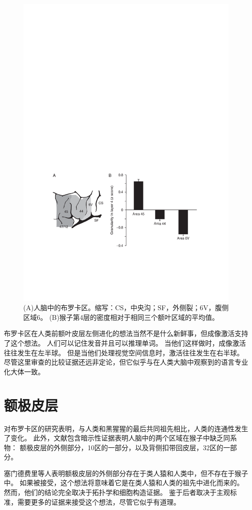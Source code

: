 \begin{figure}[!htb]
	\centering
	\includegraphics[width=0.5\linewidth]{chap9/9_3}
	\caption{(A)人脑中的布罗卡区。缩写：CS，中央沟；SF，外侧裂；6V，腹侧区域6。
		(B)猴子第4层的密度相对于相同三个额叶区域的平均值\cite{petrides2005orofacial}。\label{fig:fig_9_3}}
\end{figure}

\par

布罗卡区在人类前额叶皮层左侧进化的想法当然不是什么新鲜事，但成像激活支持了这个想法。
人们可以记住发音\cite{conrad1972short}并且可以推理单词\cite{goel2004differential}。
当他们这样做时，成像激活往往发生在左半球。
但是当他们处理视觉空间信息时，激活往往发生在右半球\cite{smith1996dissociating}。
尽管这里审查的比较证据还远非定论，但它似乎与在人类大脑中观察到的语言专业化大体一致。



\section{额极皮层}

对布罗卡区的研究表明，与人类和黑猩猩的最后共同祖先相比，人类的连通性发生了变化。
此外，文献包含暗示性证据表明人脑中的两个区域在猴子中缺乏同系物：
额极皮层的外侧部分，10区的一部分，以及背侧扣带回皮层，32区的一部分。
\par


塞门德费里等人\cite{semendeferi2001prefrontal}表明额极皮层的外侧部分存在于类人猿和人类中，但不存在于猴子中。
如果被接受，这个想法将意味着它是在类人猿和人类的祖先中进化而来的。
然而，他们的结论完全取决于拓扑学和细胞构造证据。
鉴于后者取决于主观标准，需要更多的证据来接受这个想法，尽管它似乎有道理。
\par


